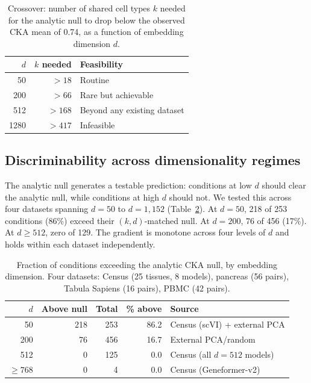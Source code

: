 \documentclass[11pt]{article}
\begin{document}
\begin{table}[t]
\centering
\caption{Crossover: number of shared cell types $k$ needed for the
analytic null to drop below the observed CKA mean of 0.74, as a function
of embedding dimension $d$.}
\label{tab:crossover}
\small
\begin{tabular}{@{}rrl@{}}
\toprule
$d$ & $k$ needed & Feasibility \\
\midrule
50   & $> 18$  & Routine \\
200  & $> 66$  & Rare but achievable \\
512  & $> 168$ & Beyond any existing dataset \\
1280 & $> 417$ & Infeasible \\
\bottomrule
\end{tabular}
\end{table}


\subsection{Discriminability across dimensionality regimes}
\label{sec:deffect}

The analytic null generates a testable prediction: conditions at low $d$
should clear the analytic null, while conditions at high $d$ should not. We
tested this across four datasets spanning $d = 50$ to $d = 1{,}152$
(Table~\ref{tab:deffect}). At $d = 50$, 218 of 253 conditions (86\%)
exceed their $(k, d)$-matched null. At $d = 200$, 76 of 456 (17\%).
At $d \geq 512$, zero of 129. The gradient is monotone across four
levels of $d$ and holds within each dataset independently.

\begin{table}[t]
\centering
\caption{Fraction of conditions exceeding the analytic CKA null, by
embedding dimension. Four datasets: Census (25 tissues, 8 models),
pancreas (56 pairs), Tabula Sapiens (16 pairs), PBMC (42 pairs).}
\label{tab:deffect}
\small
\begin{tabular}{@{}rrrrl@{}}
\toprule
$d$ & Above null & Total & \% above & Source \\
\midrule
50   & 218 & 253 & 86.2 & Census (scVI) + external PCA \\
200  &  76 & 456 & 16.7 & External PCA/random \\
512  &   0 & 125 &  0.0 & Census (all $d{=}512$ models) \\
$\geq 768$ & 0 & 4 & 0.0 & Census (Geneformer-v2) \\
\bottomrule
\end{tabular}
\end{table}
\end{document}
